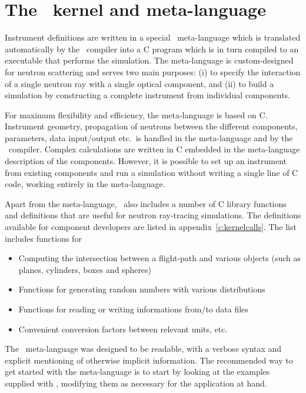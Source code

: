 
\chapter{The \MCS\ kernel and meta-language}
\label{s:kernel}

Instrument definitions are written in a special \MCS\ meta-language which
is translated automatically by the \MCS\ compiler into a C program
which is in turn compiled to an executable that
performs the simulation. The meta-language is custom-designed for neutron
scattering and serves two main purposes: (i) to specify the interaction of a
single neutron ray with a single optical component, and (ii) to build a
simulation by constructing a complete instrument from individual
components.

For maximum flexibility and efficiency, the meta-language is based on C.
Instrument geometry, propagation of neutrons between the different
components, parameters, data input/output etc.\ is handled in the
meta-language and by the \MCS\ compiler. Complex calculations are written in
C embedded in the meta-language description of the
components. However, it is
possible to set up an instrument from existing components and
run a simulation without writing a single line of C code, working
entirely in the meta-language.

Apart from the meta-language, \MCS\ also includes a number of C library
functions and definitions that are useful for neutron ray-tracing
simulations. The definitions available for component developers are
listed in appendix~\ref{c:kernelcalls}. The list includes functions
for
\begin{itemize}
\item Computing the intersection between a flight-path and various
  objects (such as planes, cylinders, boxes and spheres)
\item Functions for generating random numbers
with various distributions
\item Functions for reading or writing informations from/to data
  files
\item Convenient conversion factors between relevant units, etc.
\end{itemize}

The \MCS\ meta-language was designed to be readable, with a verbose
syntax and explicit mentioning of otherwise implicit information. The
recommended way to get started with the meta-language is to start by
looking at the examples supplied with \MCS, modifying them as necessary
for the application at hand.

